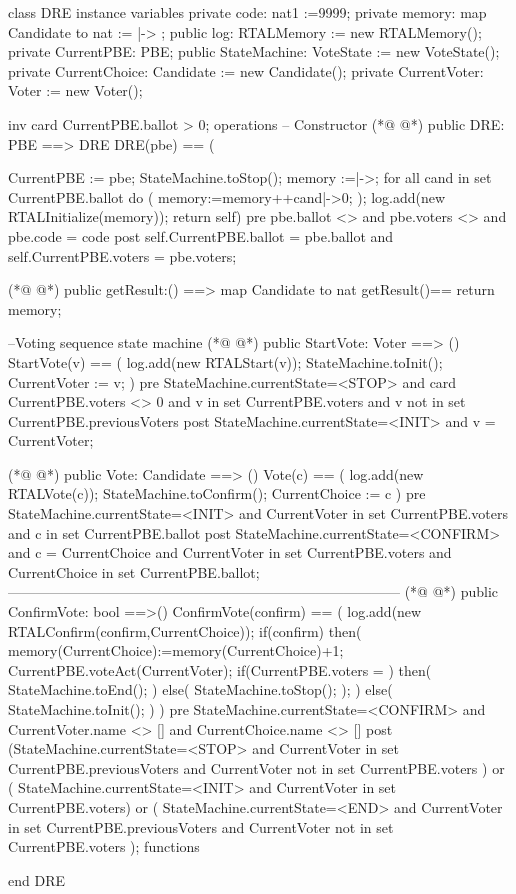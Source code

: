 \begin{vdmpp}
class DRE
instance variables
 private code: nat1 :=9999;
 private memory: map Candidate to nat := {|->} ;
 public log: RTALMemory := new RTALMemory();
 private CurrentPBE: PBE;
 public StateMachine: VoteState := new VoteState();
 private CurrentChoice: Candidate := new Candidate(); 
 private CurrentVoter: Voter := new Voter();
 
 inv card CurrentPBE.ballot > 0;
operations
-- Constructor
(*@
\label{DRE:14}
@*)
 public DRE: PBE ==> DRE 
 DRE(pbe) == (
       
       CurrentPBE := pbe;
       StateMachine.toStop();
       memory :={|->};
       for all cand in set CurrentPBE.ballot do
          (
        memory:=memory++{cand|->0};
          );
          log.add(new RTALInitialize(memory));
       return self)
 pre 
  pbe.ballot <> {}
  and pbe.voters <> {}
  and pbe.code = code
 post 
  self.CurrentPBE.ballot = pbe.ballot
  and self.CurrentPBE.voters = pbe.voters;
 
(*@
\label{getResult:34}
@*)
 public getResult:() ==> map Candidate to nat
 getResult()== return memory;
 
--Voting sequence state machine
(*@
\label{StartVote:38}
@*)
 public StartVote: Voter ==> ()
 StartVote(v) == (
   log.add(new RTALStart(v));
   StateMachine.toInit();
   CurrentVoter := v;
 )
 pre StateMachine.currentState=<STOP>
   and card CurrentPBE.voters <> 0
   and v in set CurrentPBE.voters
   and v not in set CurrentPBE.previousVoters
 post StateMachine.currentState=<INIT>
    and v = CurrentVoter;

(*@
\label{Vote:51}
@*)
 public Vote: Candidate ==> ()
 Vote(c) == (
   log.add(new RTALVote(c));
   StateMachine.toConfirm();
   CurrentChoice := c
 )
 pre StateMachine.currentState=<INIT>
   and CurrentVoter in set CurrentPBE.voters
   and c in set CurrentPBE.ballot
 post StateMachine.currentState=<CONFIRM>
    and c = CurrentChoice
    and CurrentVoter in set CurrentPBE.voters
    and CurrentChoice in set CurrentPBE.ballot;
 ------------------------------------------------------------------------------------
(*@
\label{ConfirmVote:65}
@*)
 public ConfirmVote: bool ==>()
 ConfirmVote(confirm) == (
   log.add(new RTALConfirm(confirm,CurrentChoice));
   if(confirm)
   then(
     memory(CurrentChoice):=memory(CurrentChoice)+1;
     CurrentPBE.voteAct(CurrentVoter); 
     if(CurrentPBE.voters = {})
     then(
      StateMachine.toEnd();
     )
     else(
      StateMachine.toStop();
     );
     )
   else(
     StateMachine.toInit();
     )
 )
 pre StateMachine.currentState=<CONFIRM> 
   and CurrentVoter.name <> []
   and CurrentChoice.name <> []
 post (StateMachine.currentState=<STOP>
    and CurrentVoter in set CurrentPBE.previousVoters
    and CurrentVoter not in set CurrentPBE.voters
    )
    or (
    StateMachine.currentState=<INIT>
    and CurrentVoter in set CurrentPBE.voters)
    or (
    StateMachine.currentState=<END>
    and CurrentVoter in set CurrentPBE.previousVoters
    and CurrentVoter not in set CurrentPBE.voters
    );
functions
 
end DRE
\end{vdmpp}
